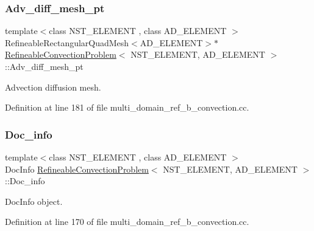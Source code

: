 \subsubsection{\texorpdfstring{Adv\+\_\+diff\+\_\+mesh\+\_\+pt}{Adv\_diff\_mesh\_pt}}
{\footnotesize\ttfamily template$<$class N\+S\+T\+\_\+\+E\+L\+E\+M\+E\+NT , class A\+D\+\_\+\+E\+L\+E\+M\+E\+NT $>$ \\
Refineable\+Rectangular\+Quad\+Mesh$<$A\+D\+\_\+\+E\+L\+E\+M\+E\+NT$>$$\ast$ \hyperlink{classRefineableConvectionProblem}{Refineable\+Convection\+Problem}$<$ N\+S\+T\+\_\+\+E\+L\+E\+M\+E\+NT, A\+D\+\_\+\+E\+L\+E\+M\+E\+NT $>$\+::Adv\+\_\+diff\+\_\+mesh\+\_\+pt\hspace{0.3cm}{\ttfamily [protected]}}



Advection diffusion mesh. 



Definition at line 181 of file multi\+\_\+domain\+\_\+ref\+\_\+b\+\_\+convection.\+cc.

\mbox{\label{classRefineableConvectionProblem_acf0b222e2ae8efc508536e578c3a359e}} 
\subsubsection{\texorpdfstring{Doc\+\_\+info}{Doc\_info}}
{\footnotesize\ttfamily template$<$class N\+S\+T\+\_\+\+E\+L\+E\+M\+E\+NT , class A\+D\+\_\+\+E\+L\+E\+M\+E\+NT $>$ \\
Doc\+Info \hyperlink{classRefineableConvectionProblem}{Refineable\+Convection\+Problem}$<$ N\+S\+T\+\_\+\+E\+L\+E\+M\+E\+NT, A\+D\+\_\+\+E\+L\+E\+M\+E\+NT $>$\+::Doc\+\_\+info\hspace{0.3cm}{\ttfamily [private]}}



Doc\+Info object. 



Definition at line 170 of file multi\+\_\+domain\+\_\+ref\+\_\+b\+\_\+convection.\+cc.

\mbox{\label{classRefineableConvectionProblem_af5a23ac1fe5407159089c5909e86f026}} 
